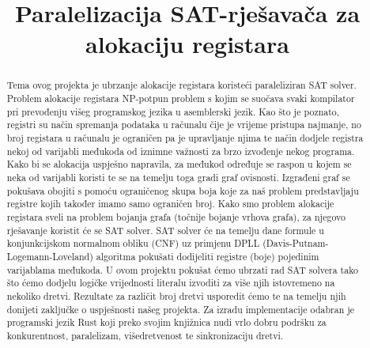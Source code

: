 \documentclass[conference]{IEEEtran}
\begin{document}

\title{Paralelizacija SAT-rješavača za alokaciju registara\\
}

\author{
\and
{}
\and
{}
\and
{}
\and
{}
}

\maketitle

\begin{abstract}
Tema ovog projekta je ubrzanje alokacije registara koristeći paraleliziran SAT solver. Problem alokacije registara NP-potpun problem s kojim se suočava svaki kompilator pri prevođenju višeg programskog jezika u asemblerski jezik. Kao što je poznato, registri su način spremanja podataka u računalu čije je vrijeme pristupa najmanje, no broj registara u računalu je ograničen pa je upravljanje njima te način dodjele registra nekoj od varijabli međukoda od iznimne važnosti za brzo izvođenje nekog programa. Kako bi se alokacija uspješno napravila, za međukod određuje se raspon u kojem se neka od varijabli koristi te se na temelju toga gradi graf ovisnosti. Izgrađeni graf se pokušava obojiti s pomoću ograničenog skupa boja koje za naš problem predstavljaju registre kojih također imamo samo ograničen broj. Kako smo problem alokacije registara sveli na problem bojanja grafa (točnije bojanje vrhova grafa), za njegovo rješavanje koristit će se SAT solver. SAT solver će na temelju dane formule u konjunkcijskom normalnom obliku (CNF) uz primjenu DPLL (Davis-Putnam-Logemann-Loveland) algoritma pokušati dodijeliti registre (boje) pojedinim varijablama međukoda. U ovom projektu pokušat ćemo ubrzati rad SAT solvera tako što ćemo dodjelu logičke vrijednosti literalu izvoditi za više njih istovremeno na nekoliko dretvi. Rezultate za različit broj dretvi usporedit ćemo te na temelju njih donijeti zaključke o uspješnosti našeg projekta. Za izradu implementacije odabran je programski jezik Rust koji preko svojim knjižnica nudi vrlo dobru podršku za konkurentnost, paralelizam, višedretvenost te sinkronizaciju dretvi.
\end{abstract}
\end{document}
